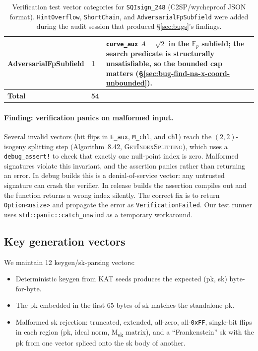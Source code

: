 \begin{table}[ht]
\begin{tabular}{@{}llp{}@{}}
AdversarialFpSubfield & 1 & \texttt{curve\_aux} $A = \sqrt{2}$ in the
  $\mathbb{F}_p$ subfield; the search predicate is structurally
  unsatisfiable, so the bounded cap matters
  (\S\ref{sec:bug-find-na-x-coord-unbounded}). \\
\midrule
\textbf{Total} & \textbf{54} & \\
\bottomrule
\end{tabular}
\caption{Verification test vector categories for
  \texttt{SQIsign\_248} (C2SP/wycheproof JSON format).
  \texttt{HintOverflow}, \texttt{ShortChain}, and
  \texttt{AdversarialFpSubfield} were added during the audit
  session that produced \S\ref{sec:bugs}'s findings.}
\label{tab:verify-vectors}
\end{table}

\paragraph{Finding: verification panics on malformed input.}
Several invalid vectors (bit flips in \texttt{E\_aux},
\texttt{M\_chl}, and \texttt{chl}) reach the $(2,2)$-isogeny
splitting step (Algorithm~8.42, \textsc{GetIndexSplitting}), which
uses a \texttt{debug\_assert!} to check that exactly one null-point
index is zero.  Malformed signatures violate this invariant, and the
assertion panics rather than returning an error.  In debug builds this
is a denial-of-service vector: any untrusted signature can crash the
verifier.  In release builds the assertion compiles out and the
function returns a wrong index silently.  The correct fix is to return
\texttt{Option<usize>} and propagate the error as
\texttt{VerificationFailed}.  Our test runner uses
\texttt{std::panic::catch\_unwind} as a temporary workaround.

\subsection{Key generation vectors}

We maintain 12 keygen/sk-parsing vectors:
\begin{itemize}[nosep]
  \item Deterministic keygen from KAT seeds produces the expected
    (pk, sk) byte-for-byte.
  \item The pk embedded in the first 65 bytes of sk matches the
    standalone pk.
  \item Malformed sk rejection: truncated, extended, all-zero,
    all-\texttt{0xFF}, single-bit flips in each region (pk, ideal
    norm, M\textsubscript{sk} matrix), and a ``Frankenstein'' sk
    with the pk from one vector spliced onto the sk body of another.
\end{itemize}


